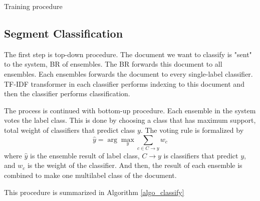 \documentclass[conference]{IEEEtran}
\makeatletter
\def\BState{\State\hskip-\ALG@thistlm}
\newcommand{\argmax}{\arg\!\max}
\makeatother
\begin{document}
\begin{algorithm}[!htb]
\caption{Training procedure}
\label{algo_train}
\end{algorithm}

\subsection{Segment Classification}

The first step is top-down procedure.
The document we want to classify is "sent" to the system, BR of ensembles.
The BR forwards this document to all ensembles.
Each ensembles forwards the document to every single-label classifier.
TF-IDF transformer in each classifier performs indexing to this document and then the classifier performs classification.

The process is continued with bottom-up procedure.
Each ensemble in the system votes the label class.
This is done by choosing a class that has maximum support, total weight of classifiers that predict class $y$.
The voting rule is formalized by
\[\hat{y} = \argmax_y \sum_{c \in C \rightarrow y} w_c\]
where $\hat{y}$ is the ensemble result of label class, $C \rightarrow y$ is classifiers that predict $y$, and $w_c$ is the weight of the classifier.
And then, the result of each ensemble is combined to make one multilabel class of the document.

This procedure is summarized in Algorithm \ref{algo_classify}
\end{document}
